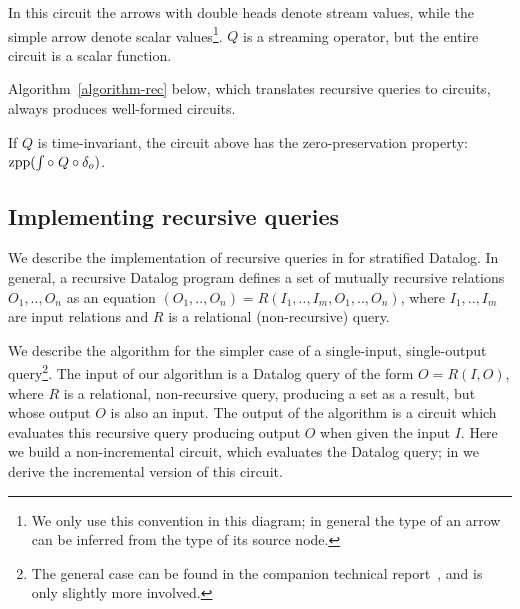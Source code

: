In this circuit the arrows with double
heads denote stream values, while the simple arrow denote scalar values\footnote{We only use this convention in this diagram; 
in general the type of an arrow can be inferred from the type
of its source node.}.  $Q$ is a streaming operator, but the entire circuit is a scalar function.

Algorithm~\ref{algorithm-rec} below, which translates recursive queries to 
\dbsp circuits, always produces well-formed circuits.
\begin{proposition}
If $Q$ is time-invariant, the circuit above has the zero-preservation
property: $\mbox{zpp}(\int \circ\; Q \circ \delta_o)$.
\end{proposition}

\subsection{Implementing recursive queries}\label{sec:datalog}

We describe the implementation of recursive queries in \dbsp for
stratified Datalog.  
In general, a recursive Datalog program defines a set of
mutually recursive relations $O_1,..,O_n$ as an equation
$(O_1,..,O_n)=R(I_1,..,I_m, O_1,..,O_n)$, where $I_1,..,I_m$ are
input relations and $R$ is a relational (non-recursive) query.

We describe the algorithm for 
the simpler case of a single-input, single-output query\footnote{The general case
can be found in the companion technical report~, and is only 
slightly more involved.}.  The input of our algorithm is a Datalog query of the form
$O = R(I, O)$, where $R$ is a relational, non-recursive query, 
producing a set as a result, but whose output $O$ is also an input.  
The output of the algorithm is a \dbsp circuit which evaluates this
recursive query producing output $O$ when given the input $I$.  Here we build
a non-incremental circuit, which evaluates the Datalog query;
in  we derive the incremental version
of this circuit.

